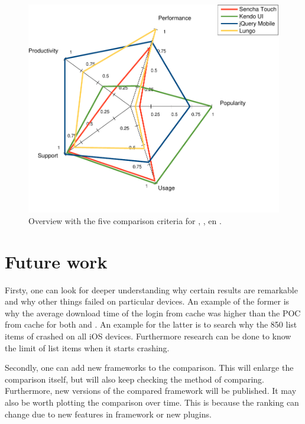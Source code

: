 \documentclass[a4paper]{artikel3}
\begin{document}
\begin{figure}
  \centering
  \includegraphics[width=\columnwidth]{../Masterproef/figuren/spidergraph-final-en.pdf}
  \caption{Overview with the five comparison criteria for \sta{},  \kendoa{},  \jqma{} en \lungo{}.}
  \label{fig:spidergraph}
\end{figure}


\section{Future work} %
\label{sec:future_work}
Firsty, one can look for deeper understanding why certain results are remarkable and why other things failed on particular devices.
An example of the former is why the average download time of the login from cache was higher than the POC from cache for both \jqma{} and \lungo{}.
An example for the latter is to search why the 850 list items of \kendoa{} crashed on all iOS devices.
Furthermore research can be done to know the limit of list items when it starts crashing.

Secondly, one can add new frameworks to the comparison.
This will enlarge the comparison itself, but will also keep checking the method of comparing.
Furthermore, new versions of the compared framework will be published.
It may also be worth plotting the comparison over time.
This is because the ranking can change due to new features in framework or new plugins.
\end{document}
